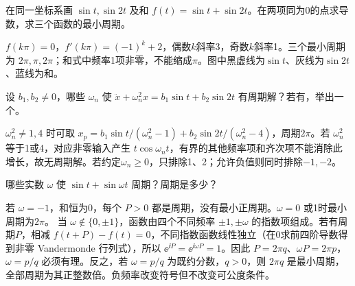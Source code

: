 \begin{exercise}\label{cw:rec13-4}
在同一坐标系画 $\sin t,\sin2t$ 及和 $f(t)=\sin t+\sin2t$。在两项同为0的点求导数，求三个函数的最小周期。
\end{exercise}
\begin{solution}
$f(k\pi)=0$，$f'(k\pi)=(-1)^k+2$，偶数$k$斜率3，奇数$k$斜率1。三个最小周期为 $2\pi,\pi,2\pi$；和式中频率1项非零，不能缩成$\pi$。图中黑虚线为$\sin t$、灰线为$\sin2t$、蓝线为和。\begin{center}\end{center}
\par{}
\end{solution}

\begin{exercise}\label{cw:rec13-5}
设 $b_1,b_2\ne0$，哪些 $\omega_n$ 使 $\ddot x+\omega_n^2x=b_1\sin t+b_2\sin2t$ 有周期解？若有，举出一个。
\end{exercise}
\begin{solution}
$\omega_n^2\ne1,4$ 时可取 $x_p=b_1\sin t/(\omega_n^2-1)+b_2\sin2t/(\omega_n^2-4)$，周期$2\pi$。若 $\omega_n^2$ 等于1或4，对应非零输入产生 $t\cos\omega_nt$，有界的其他频率项和齐次项不能消除此增长，故无周期解。若约定$\omega_n\ge0$，只排除1、2；允许负值则同时排除$-1,-2$。
\par{}
\end{solution}

\begin{exercise}\label{cw:rec13-6}
哪些实数 $\omega$ 使 $\sin t+\sin\omega t$ 周期？周期是多少？
\end{exercise}
\begin{solution}
若 $\omega=-1$，和恒为0，每个 $P>0$ 都是周期，没有最小正周期。$\omega=0$ 或1时最小周期为$2\pi$。
当 $\omega\notin\{0,\pm1\}$，函数由四个不同频率 $\pm1,\pm\omega$ 的指数项组成。若有周期$P$，相减 $f(t+P)-f(t)=0$，不同指数函数线性独立（在0求前四阶导数得到非零 Vandermonde 行列式），所以 $\ee^{\ii P}=\ee^{\ii\omega P}=1$。因此 $P=2\pi q$、$\omega P=2\pi p$，$\omega=p/q$ 必须有理。反之，若 $\omega=p/q$ 为既约分数，$q>0$，则 $2\pi q$ 是最小周期，全部周期为其正整数倍。负频率改变符号但不改变可公度条件。
\par{}
\end{solution}

